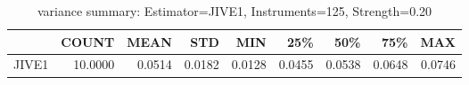 \begin{table}[ht]
\centering
\caption{variance summary: Estimator=JIVE1, Instruments=125, Strength=0.20}
\begin{tabular}{lrrrrrrrr}
\toprule
 & COUNT & MEAN & STD & MIN & 25\% & 50\% & 75\% & MAX \\
\midrule
JIVE1 & 10.0000 & 0.0514 & 0.0182 & 0.0128 & 0.0455 & 0.0538 & 0.0648 & 0.0746 \\
\bottomrule
\end{tabular}
\end{table}
